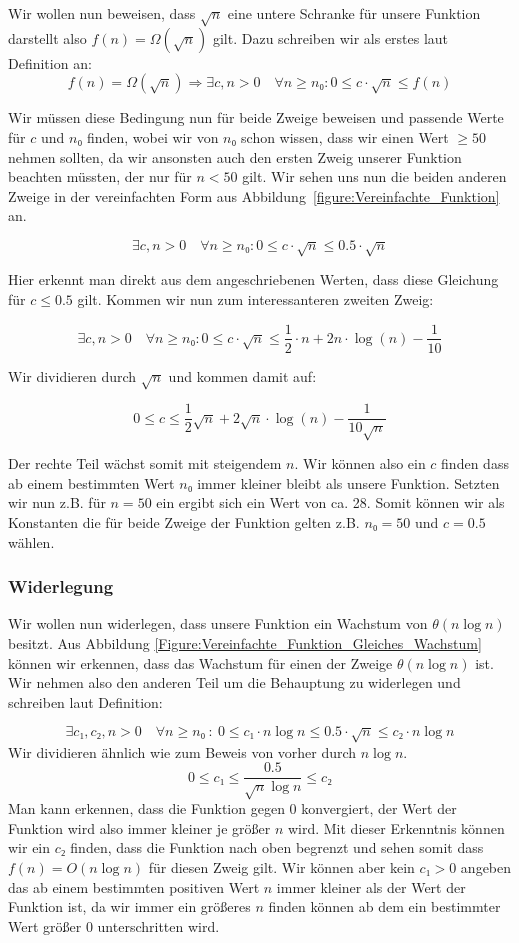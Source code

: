 \documentclass[a4paper, 12pt]{article}
\begin{document}
Wir wollen nun beweisen, dass $\sqrt n$ eine untere Schranke für unsere Funktion darstellt also $f\left(n\right) = Ω \left(\sqrt n\right)$ gilt. Dazu schreiben wir als erstes laut Definition an:
\[
	f\left(n\right)=Ω \left(\sqrt n\right) \Rightarrow
	∃ c,n > 0 \quad ∀ n≥ n₀: 0 ≤ c ⋅ \sqrt n≤ 
	f\left(n\right)
\]

Wir müssen diese Bedingung nun für beide Zweige beweisen und passende Werte für $c$ und $n₀$ finden, wobei wir von $n₀$ schon wissen, dass wir einen Wert $≥ 50$ nehmen sollten, da wir ansonsten auch den ersten Zweig unserer Funktion beachten müssten, der nur für $n < 50$ gilt. Wir sehen uns nun die beiden anderen Zweige in der vereinfachten Form aus Abbildung~\ref{figure:Vereinfachte_Funktion} an.

\[
	∃ c,n > 0 \quad ∀ n ≥ n₀ : 0 ≤ c⋅ \sqrt n ≤ 0.5 ⋅ \sqrt n
\]

Hier erkennt man direkt aus dem angeschriebenen Werten, dass diese Gleichung für $c ≤ 0.5$ gilt. Kommen wir nun zum interessanteren zweiten Zweig:

\[
	∃ c,n > 0 \quad ∀ n≥ n₀:
	0 ≤ c⋅ \sqrt n ≤ \frac{1}{2}⋅ n + 2 n ⋅ \log\left(n\right) - \frac{1}{10}
\]

Wir dividieren durch $\sqrt n$ und kommen damit auf:

\[
	0 ≤ c ≤ 
	\frac{1}{2} \sqrt n + 2 \sqrt n ⋅ \log\left(n\right) - \frac{1}{10\sqrt n}
\]

Der rechte Teil wächst somit mit steigendem $n$. Wir können also ein $c$ finden dass ab einem bestimmten Wert $n₀$ immer kleiner bleibt als unsere Funktion. Setzten wir nun z.B. für $n = 50$ ein ergibt sich ein Wert von ca. 28. Somit können wir als Konstanten die für beide Zweige der Funktion gelten z.B. $n₀=50$ und $c=0.5$ wählen.

\subsubsection{Widerlegung}

Wir wollen nun widerlegen, dass unsere Funktion ein Wachstum von \break $θ \left(n \log n\right)$ besitzt. Aus Abbildung \ref{Figure:Vereinfachte_Funktion_Gleiches_Wachstum} können wir erkennen, dass das Wachstum für einen der Zweige  $θ \left(n \log n\right)$ ist. Wir nehmen also den anderen Teil um die Behauptung zu widerlegen und schreiben laut Definition:

\[
	∃ c₁,c₂, n > 0 \quad ∀ n ≥ n₀ ~ : ~
	0 ≤ c₁⋅ n \log n ≤ 0.5 ⋅ \sqrt n ≤ c₂ ⋅ n \log n
\]
Wir dividieren ähnlich wie zum Beweis von vorher durch $n \log n$.
\[
	0 ≤ c₁ ≤ \frac{0.5}{\sqrt{n}\log n} ≤ c₂
\]
Man kann erkennen, dass die Funktion gegen 0 konvergiert, der Wert der Funktion wird also immer kleiner je größer $n$ wird. Mit dieser Erkenntnis können wir ein $c₂$ finden, dass die Funktion nach oben begrenzt und sehen somit dass $f\left(n\right)=O\left(n\log n\right)$ für diesen Zweig gilt. Wir können aber kein $c₁ > 0$ angeben das ab einem bestimmten positiven Wert $n$ immer kleiner als der Wert der Funktion ist, da wir immer ein größeres $n$ finden können ab dem ein bestimmter Wert größer 0 unterschritten wird.\\
\end{document}
